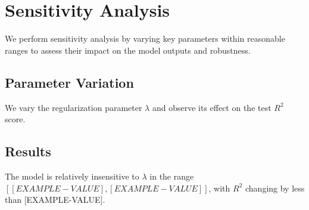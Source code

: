 \section{Sensitivity Analysis}

We perform sensitivity analysis by varying key parameters within reasonable ranges to assess their impact on the model outputs and robustness.

\subsection{Parameter Variation}
We vary the regularization parameter $\lambda$ and observe its effect on the test $R^2$ score.

\subsection{Results}
The model is relatively insensitive to $\lambda$ in the range $[[EXAMPLE-VALUE], [EXAMPLE-VALUE]]$, with $R^2$ changing by less than [EXAMPLE-VALUE].
